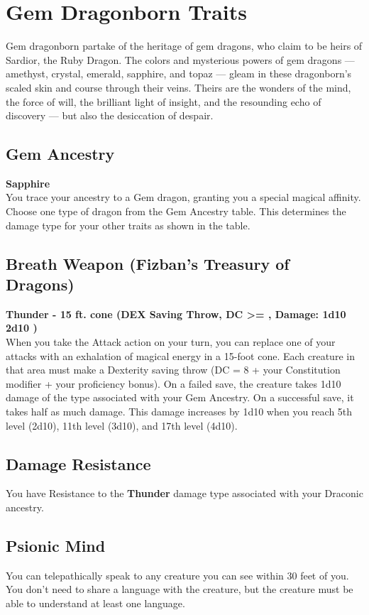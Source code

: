 \documentclass[letterpaper,openany,oneside,twocolumn]{book}
\def\BreathWeaponDamage{\ifthenelse{\LevelValue < 5}%
	{1d10}%
	{%
		\ifthenelse{\LevelValue < 11}%
		{2d10}%
		{%
			\ifthenelse{\LevelValue < 17}{3d10}{4d10}%
		}%
	}%
}
\begin{document}
\section*{Gem Dragonborn Traits}
Gem dragonborn partake of the heritage of gem dragons, who claim to be heirs of Sardior, the Ruby Dragon. The colors and mysterious powers of gem dragons — amethyst, crystal, emerald, sapphire, and topaz — gleam in these dragonborn's scaled skin and course through their veins. Theirs are the wonders of the mind, the force of will, the brilliant light of insight, and the resounding echo of discovery — but also the desiccation of despair.
\subsection*{Gem Ancestry}
\textbf{Sapphire} \\
You trace your ancestry to a Gem dragon, granting you a special magical affinity. Choose one type of dragon from the Gem Ancestry table. This determines the damage type for your other traits as shown in the table.
\subsection*{Breath Weapon (Fizban's Treasury of Dragons)}
\textbf{Thunder - 15 ft. cone (DEX Saving Throw, DC >= , Damage: \BreathWeaponDamage )} \\
When you take the Attack action on your turn, you can replace one of your attacks with an exhalation of magical energy in a 15-foot cone. Each creature in that area must make a Dexterity saving throw (DC = 8 + your Constitution modifier + your proficiency bonus). On a failed save, the creature takes 1d10 damage of the type associated with your Gem Ancestry. On a successful save, it takes half as much damage. This damage increases by 1d10 when you reach 5th level (2d10), 11th level (3d10), and 17th level (4d10).
\subsection*{Damage Resistance}
You have Resistance to the \textbf{Thunder} damage type associated with your Draconic ancestry.
\subsection*{Psionic Mind}
You can telepathically speak to any creature you can see within 30 feet of you. You don't need to share a language with the creature, but the creature must be able to understand at least one language.
\end{document}
